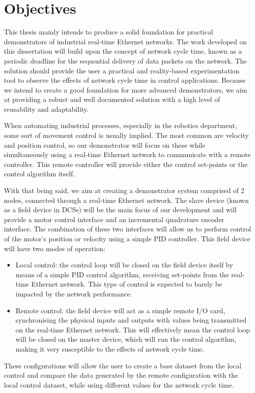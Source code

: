 \section{Objectives} \label{sec:objectives}

This thesis mainly intends to produce a solid foundation for practical demonstrators of industrial real-time Ethernet networks.
The work developed on this dissertation will build upon the concept of network cycle time, known as a periodic deadline for the sequential delivery of data packets on the network.
The solution should provide the user a practical and reality-based experimentation tool to observe the effects of network cycle time in control applications.
Because we intend to create a good foundation for more advanced demonstrators, we aim at providing a robust and well documented solution with a high level of reusability and adaptability.

When automating industrial processes, especially in the robotics department, some sort of movement control is usually implied.
The most common are velocity and position control, so our demonstrator will focus on these while simultaneously using a real-time Ethernet network to communicate with a remote controller.
This remote controller will provide either the control set-points or the control algorithm itself.

With that being said, we aim at creating a demonstrator system comprised of 2 nodes, connected through a real-time Ethernet network.
The slave device (known as a field device in DCSs) will be the main focus of our development and will provide a motor control interface and an incremental quadrature encoder interface.
The combination of these two interfaces will allow us to perform control of the motor's position or velocity using a simple PID controller.
This field device will have two modes of operation:

\begin{itemize}
	\item Local control: the control loop will be closed on the field device itself by means of a simple PID control algorithm, receiving set-points from the real-time Ethernet network. This type of control is expected to barely be impacted by the network performance.

	\item Remote control: the field device will act as a simple remote I/O card, synchronising the physical inputs and outputs with values being transmitted on the real-time Ethernet network. This will effectively mean the control loop will be closed on the master device, which will run the control algorithm, making it very susceptible to the effects of network cycle time.
\end{itemize}

These configurations will allow the user to create a base dataset from the local control and compare the data generated by the remote configuration with the local control dataset, while using different values for the network cycle time.
